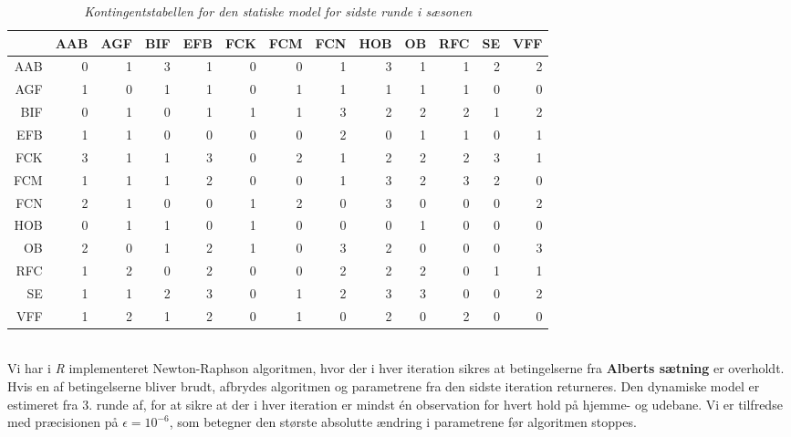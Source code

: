 \documentclass[11pt,a4paper]{article}
\begin{document}
\begin{table}[ht]
\centering
\begin{adjustbox}{max width=\textwidth}
\begin{tabular}{|rrrrrrrrrrrrr|}
  \hline
 & AAB & AGF & BIF & EFB & FCK & FCM & FCN & HOB & OB & RFC & SE & VFF \\ 
  \hline
AAB &   0 &   1 &   3 &   1 &   0 &   0 &   1 &   3 &   1 &   1 &   2 &   2 \\ 
  AGF &   1 &   0 &   1 &   1 &   0 &   1 &   1 &   1 &   1 &   1 &   0 &   0 \\ 
  BIF &   0 &   1 &   0 &   1 &   1 &   1 &   3 &   2 &   2 &   2 &   1 &   2 \\ 
  EFB &   1 &   1 &   0 &   0 &   0 &   0 &   2 &   0 &   1 &   1 &   0 &   1 \\ 
  FCK &   3 &   1 &   1 &   3 &   0 &   2 &   1 &   2 &   2 &   2 &   3 &   1 \\ 
  FCM &   1 &   1 &   1 &   2 &   0 &   0 &   1 &   3 &   2 &   3 &   2 &   0 \\ 
  FCN &   2 &   1 &   0 &   0 &   1 &   2 &   0 &   3 &   0 &   0 &   0 &   2 \\ 
  HOB &   0 &   1 &   1 &   0 &   1 &   0 &   0 &   0 &   1 &   0 &   0 &   0 \\ 
  OB &   2 &   0 &   1 &   2 &   1 &   0 &   3 &   2 &   0 &   0 &   0 &   3 \\ 
  RFC &   1 &   2 &   0 &   2 &   0 &   0 &   2 &   2 &   2 &   0 &   1 &   1 \\ 
  SE &   1 &   1 &   2 &   3 &   0 &   1 &   2 &   3 &   3 &   0 &   0 &   2 \\ 
  VFF &   1 &   2 &   1 &   2 &   0 &   1 &   0 &   2 &   0 &   2 &   0 &   0 \\ 
   \hline
\end{tabular}
\end{adjustbox}
\caption{\label{tab:Kontingentstabel}\textit{Kontingentstabellen for den statiske model for sidste runde i sæsonen}}
\end{table}
\\Vi har i \textit{R} implementeret Newton-Raphson algoritmen, hvor der i hver iteration sikres at betingelserne fra \textbf{Alberts sætning} er overholdt. Hvis en af betingelserne bliver brudt, afbrydes algoritmen og parametrene fra den sidste iteration returneres. Den dynamiske model er estimeret fra 3. runde af, for at sikre at der i hver iteration er mindst én observation for hvert hold på hjemme- og udebane. Vi er tilfredse med præcisionen på $\epsilon = 10^{-6}$, som betegner den største absolutte ændring i parametrene før algoritmen stoppes.
\end{document}
